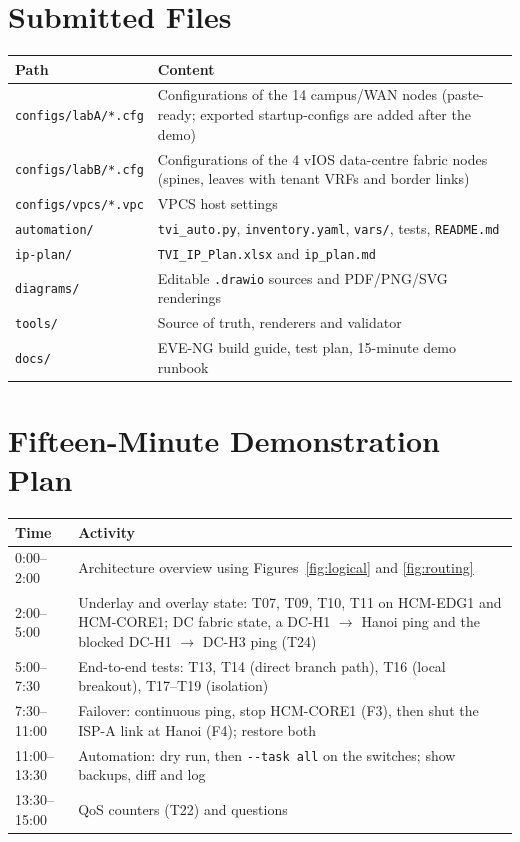 \documentclass[11pt,a4paper]{article}
\begin{document}
\appendix
\section{Submitted Files}
\begin{table}[H]
\centering\small
\begin{tabularx}{\linewidth}{@{}l X@{}}
\toprule
\textbf{Path} & \textbf{Content}\\
\midrule
\texttt{configs/labA/*.cfg} & Configurations of the 14 campus/WAN nodes (paste-ready; exported startup-configs are added after the demo)\\
\texttt{configs/labB/*.cfg} & Configurations of the 4 vIOS data-centre fabric nodes (spines, leaves with tenant VRFs and border links)\\
\texttt{configs/vpcs/*.vpc} & VPCS host settings\\
\texttt{automation/} & \texttt{tvi\_auto.py}, \texttt{inventory.yaml}, \texttt{vars/}, tests, \texttt{README.md}\\
\texttt{ip-plan/} & \texttt{TVI\_IP\_Plan.xlsx} and \texttt{ip\_plan.md}\\
\texttt{diagrams/} & Editable \texttt{.drawio} sources and PDF/PNG/SVG renderings\\
\texttt{tools/} & Source of truth, renderers and validator\\
\texttt{docs/} & EVE-NG build guide, test plan, 15-minute demo runbook\\
\bottomrule
\end{tabularx}
\end{table}

\section{Fifteen-Minute Demonstration Plan}
\begin{tabularx}{\linewidth}{@{}p{1.5cm}X@{}}
\toprule
\textbf{Time} & \textbf{Activity}\\
\midrule
0:00--2:00 & Architecture overview using Figures~\ref{fig:logical} and \ref{fig:routing}\\
2:00--5:00 & Underlay and overlay state: T07, T09, T10, T11 on HCM-EDG1 and HCM-CORE1; DC fabric state, a DC-H1 $\rightarrow$ Hanoi ping and the blocked DC-H1 $\rightarrow$ DC-H3 ping (T24)\\
5:00--7:30 & End-to-end tests: T13, T14 (direct branch path), T16 (local breakout), T17--T19 (isolation)\\
7:30--11:00 & Failover: continuous ping, stop HCM-CORE1 (F3), then shut the ISP-A link at Hanoi (F4); restore both\\
11:00--13:30 & Automation: dry run, then \texttt{-{}-task all} on the switches; show backups, diff and log\\
13:30--15:00 & QoS counters (T22) and questions\\
\bottomrule
\end{tabularx}
\end{document}
